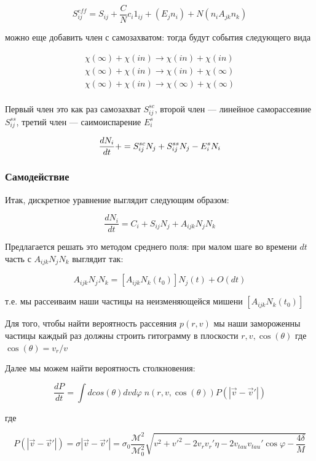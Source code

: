 \[
	S^{eff}_{ij} = S_{ij} + \frac{C}{N} c_i 1_{ij} + (E_j n_i) + N(  n_i A_{jk} n_k )
\]

можно еще добавить член с самозахватом: тогда будут события следующего вида

\[
	\begin{split}
		\chi(\infty) + \chi(in) \to  \chi(in) + \chi(in)\\
		\chi(\infty) + \chi(in) \to  \chi(in) + \chi(\infty) \\
		\chi(\infty) + \chi(in) \to  \chi(\infty) + \chi(\infty) \\
	\end{split}
\]

Первый член это как раз самозахват $S^{sc}_{ij}$, второй член --- линейное саморассеяние $S^{ss}_{ij}$, третий член --- саимоиспарение $E^{s}_{i}$

$$
	\frac{d N_i}{d t} += S^{sc}_{ij} N_j + S^{ss}_{ij} N_j - E^{s}_i N_i
$$



\subsubsection{Самодействие}

Итак, дискретное уравнение выглядит следующим образом:

\begin{equation}
	\frac{dN_i}{dt} = C_i + S_{ij} N_j + A_{ijk} N_j N_k
\end{equation}

Предлагается решать это методом среднего поля: при малом шаге во времени $dt$ часть с 
$A_{ijk} N_j N_k$ выглядит так:

\[
	A_{ijk} N_j N_k = [ A_{ijk} N_k(t_0) ] N_j(t) + O(dt)
\]

т.е. мы рассеиваим наши частицы на неизменяющейся мишени $[ A_{ijk} N_k(t_0) ]$

Для того, чтобы найти вероятность рассеяния $p(r,v)$ мы наши замороженны частицы каждый раз должны строить гитограмму в плоскости $r,v,\cos(\theta)$ где $\cos(\theta) = v_r/v$

Далее мы можем найти вероятность столкновения:

\[
	\frac{dP}{dt} = \int{dcos(\theta) dv d\varphi \; n(r,v,\cos(\theta)) P(|\vec{v}-\vec{v}'|) }
\]

где
 
\[
	P(|\vec{v}-\vec{v}'|) = \sigma |\vec{v}-\vec{v}'| = \sigma_0 \frac{\mathcal{M}^2}{\mathcal{M}_0^2} 
	\sqrt{v^2 + v'^2-2 v_r v_r' \eta -2 v_{tau} v_{tau}' \cos \varphi - \frac{4\delta}{M}}
\]


